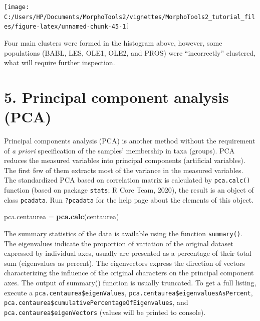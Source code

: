 \documentclass[
]{article}
\newenvironment{Shaded}{\begin{snugshade}}{\end{snugshade}}
\newcommand{\KeywordTok}[1]{\textcolor[rgb]{0.13,0.29,0.53}{\textbf{#1}}}
\newcommand{\NormalTok}[1]{#1}
\newcommand{\StringTok}[1]{\textcolor[rgb]{0.31,0.60,0.02}{#1}}
\begin{document}
\begin{center}\texttt{[image: C:/Users/HP/Documents/MorphoTools2/vignettes/MorphoTools2\_tutorial\_files/figure-latex/unnamed-chunk-45-1]} \end{center}

Four main clusters were formed in the histogram above, however, some
populations (BABL, LES, OLE1, OLE2, and PROS) were ``incorrectly''
clustered, what will require further inspection.

\hypertarget{principal-component-analysis-pca}{%
\section{5. Principal component analysis
(PCA)}\label{principal-component-analysis-pca}}

Principal components analysis (PCA) is another method without the
requirement of \emph{a priori} specification of the samples' membership
in taxa (groups). PCA reduces the measured variables into principal
components (artificial variables). The first few of them extracts most
of the variance in the measured variables. The standardized PCA based on
correlation matrix is calculated by \texttt{pca.calc()} function (based
on package \texttt{stats}; R Core Team, 2020), the result is an object
of class \texttt{pcadata}. Run \texttt{?pcadata} for the help page about
the elements of this object.

\begin{Shaded}
\begin{Highlighting}[]
\NormalTok{pca.centaurea =}\StringTok{ }\KeywordTok{pca.calc}\NormalTok{(centaurea)}
\end{Highlighting}
\end{Shaded}

The summary statistics of the data is available using the function
\texttt{summary()}. The eigenvalues indicate the proportion of variation
of the original dataset expressed by individual axes, usually are
presented as a percentage of their total sum (eigenvalues as percent).
The eigenvectors express the direction of vectors characterizing the
influence of the original characters on the principal component axes.
The output of summary() function is usually truncated. To get a full
listing, execute a \texttt{pca.centaurea\$eigenValues},
\texttt{pca.centaurea\$eigenvaluesAsPercent},
\texttt{pca.centaurea\$cumulativePercentageOfEigenvalues}, and
\texttt{pca.centaurea\$eigenVectors} (values will be printed to
console).
\end{document}
